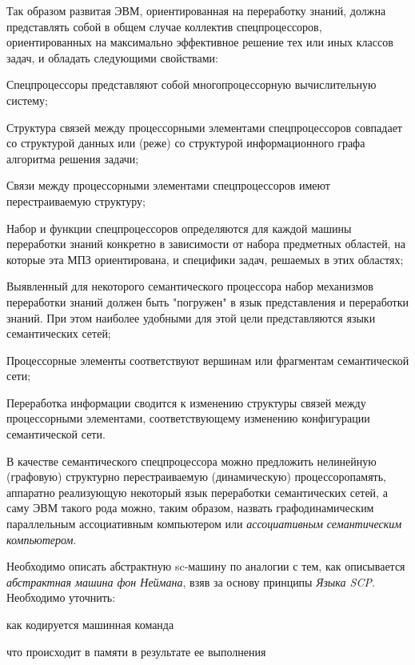 Так образом развитая ЭВМ, ориентированная на переработку знаний, должна представлять собой в общем случае коллектив спецпроцессоров, ориентированных на максимально эффективное решение тех или иных классов задач, и обладать следующими свойствами:
\begin{textitemize}
\item Спецпроцессоры представляют собой многопроцессорную вычислительную систему;
\item Структура связей между процессорными элементами спецпроцессоров совпадает со структурой данных или (реже) со структурой информационного графа алгоритма решения задачи;
\item Связи между процессорными элементами спецпроцессоров имеют перестраиваемую структуру;
\item Набор и функции спецпроцессоров определяются для каждой машины переработки знаний конкретно в зависимости от набора предметных областей, на которые эта МПЗ ориентирована, и специфики задач, решаемых в этих областях;
\item Выявленный для некоторого семантического процессора набор механизмов переработки знаний должен быть "погружен"{} в язык представления и переработки знаний. При этом наиболее удобными для этой цели представляются языки семантических сетей;
\item Процессорные элементы соответствуют вершинам или фрагментам семантической сети;
\item Переработка информации сводится к изменению структуры связей между процессорными элементами, соответствующему изменению конфигурации семантической сети.
\end{textitemize}

В качестве семантического спецпроцессора можно предложить нелинейную (графовую) структурно перестраиваемую (динамическую) процессоропамять, аппаратно реализующую некоторый язык переработки семантических сетей, а саму ЭВМ такого рода можно, таким образом, назвать графодинамическим параллельным ассоциативным компьютером или \textit{ассоциативным семантическим компьютером}.

Необходимо описать абстрактную sc-машину по аналогии с тем, как описывается \textit{абстрактная машина фон Неймана}, взяв за основу принципы \textit{Языка SCP}. Необходимо уточнить:
\begin{textitemize}
	\item как кодируется машинная команда
	\item что происходит в памяти в результате ее выполнения
\end{textitemize}

